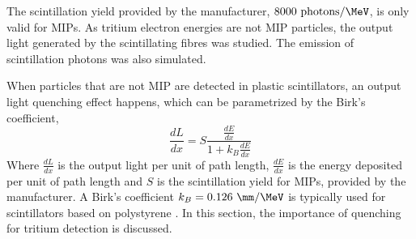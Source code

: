 The scintillation yield provided by the manufacturer, $8000~\text{photons}/\MeV$, is only valid for MIPs. As tritium electron energies are not MIP particles, the output light generated by the scintillating fibres was studied. The emission of scintillation photons was also simulated.

When particles that are not MIP are detected in plastic scintillators, an output light quenching effect happens, which can be parametrized by the Birk's coefficient\cite{BirksPaper}, 
\begin{equation}
\frac{dL}{dx}= S\frac{\displaystyle{\frac{dE}{dx}}}{1+k_B\displaystyle{\frac{dE}{dx}}}
\label{eq:birkscoefficient}
\end{equation}
Where $\displaystyle{\frac{dL}{dx}}$ is the output light per unit of path length, $\displaystyle{\frac{dE}{dx}}$ is the energy deposited per unit of path length and $S$ is the scintillation yield for MIPs, provided by the manufacturer. A Birk's coefficient $k_B=0.126~\mm/\MeV$ is typically used for scintillators based on polystyrene \cite{BirksCoefficient}. In this section, the importance of quenching for tritium detection is discussed.

